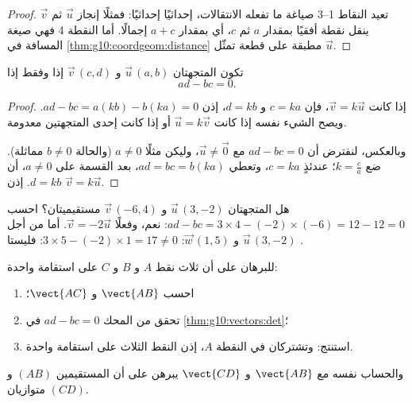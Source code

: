 \begin{proof}
تعيد النقاط 1--3 صياغة ما تفعله الانتقالات، إحداثيًا إحداثيًا: فمثلًا
إنجاز $\vec u$ ثم $\vec v$ ينقل نقطة أفقيًا بمقدار
$a$ ثم $c$، أي بمقدار $a + c$ إجمالًا. أما النقطة 4 فهي صيغة المسافة
في \cref{thm:g10:coordgeom:distance} مطبقة على قطعة تمثّل
$\vec u$.
\end{proof}

\begin{theorem}\label{thm:g10:vectors:det}
تكون المتجهتان $\vec u\,(a, b)$ و $\vec v\,(c, d)$  إذا
وفقط إذا
\[
ad - bc = 0 .
\]
\end{theorem}

\begin{proof}
إذا كانت $\vec v = k\vec u$، فإن $c = ka$ و $d = kb$، إذن
$ad - bc = a(kb) - b(ka) = 0$. ويصح الشيء نفسه إذا كانت $\vec u = k \vec v$ أو إذا كانت
إحدى المتجهتين معدومة.

وبالعكس، لنفترض أن $ad - bc = 0$ مع $\vec u \neq \vec 0$، وليكن مثلًا
$a \neq 0$ (والحالة $b \neq 0$ مماثلة). ضع $k = \frac{c}{a}$؛ عندئذٍ
$c = ka$، وتعطي $ad = bc = b(ka)$، بعد القسمة على $a \neq 0$،
أن $d = kb$. إذن $\vec v = k\vec u$.
\end{proof}

\begin{example}\label{ex:g10:vectors:det}
هل المتجهتان $\vec u\,(3, -2)$ و $\vec v\,(-6, 4)$ مستقيميتان؟ احسب
$ad - bc = 3 \times 4 - (-2)\times(-6) = 12 - 12 = 0$: نعم، وفعلًا
$\vec v = -2\vec u$. أما من أجل $\vec u\,(3, -2)$ و $\vec w\,(1, 5)$:
$3 \times 5 - (-2) \times 1 = 17 \neq 0$: فليستا .
\end{example}

\begin{method}\label{met:g10:vectors:alignment}
للبرهان على أن ثلاث نقط $A$ و $B$ و $C$ على استقامة واحدة:
\begin{enumerate}
  \item احسب  $\vect{AB}$ و $\vect{AC}$؛
  \item تحقق من المحك $ad - bc = 0$ في \cref{thm:g10:vectors:det}؛
  \item استنتج:  وتشتركان في النقطة $A$، إذن
        النقط الثلاث على استقامة واحدة.
\end{enumerate}
والحساب نفسه مع $\vect{AB}$ و $\vect{CD}$ يبرهن على أن
المستقيمين $(AB)$ و $(CD)$ متوازيان.
\end{method}

